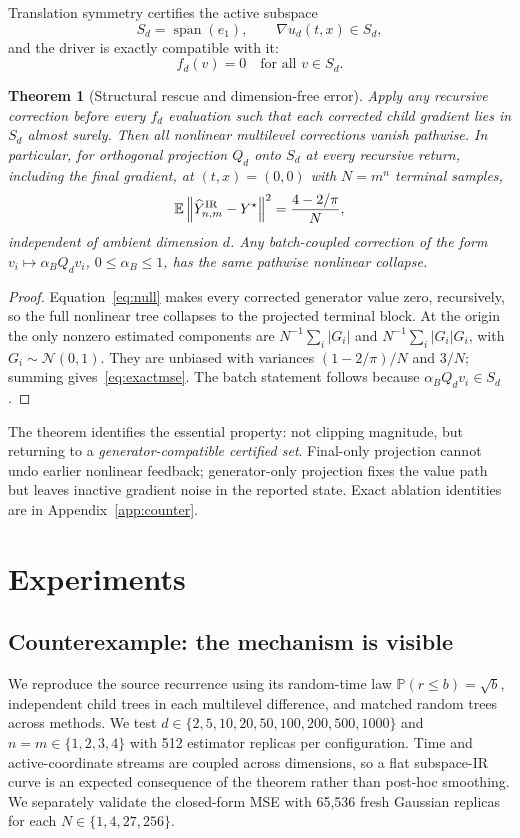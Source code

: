 \documentclass{article}
\newtheorem{theorem}{Theorem}
\newcommand{\E}{\mathbb E}
\newcommand{\norm}[1]{\left\lVert #1\right\rVert}
\begin{document}
Translation symmetry certifies the active subspace
\[
S_d=\operatorname{span}(e_1),\qquad \nabla u_d(t,x)\in S_d,
\]
and the driver is exactly compatible with it:
\begin{equation}
f_d(v)=0\quad\text{for all }v\in S_d.
\label{eq:null}
\end{equation}

\begin{theorem}[Structural rescue and dimension-free error]
\label{thm:rescue}
Apply any recursive correction before every $f_d$ evaluation such that each corrected child gradient lies in $S_d$ almost surely. Then all nonlinear multilevel corrections vanish pathwise. In particular, for orthogonal projection $Q_d$ onto $S_d$ at every recursive return, including the final gradient, at $(t,x)=(0,0)$ with $N=m^n$ terminal samples,
\begin{equation}
\E\norm{\widehat Y^{\rm IR}_{n,m}-Y^\star}^2
=\frac{4-2/\pi}{N},
\label{eq:exactmse}
\end{equation}
independent of ambient dimension $d$. Any batch-coupled correction of the form $v_i\mapsto\alpha_BQ_dv_i$, $0\le\alpha_B\le1$, has the same pathwise nonlinear collapse.
\end{theorem}
\begin{proof}
Equation~\eqref{eq:null} makes every corrected generator value zero, recursively, so the full nonlinear tree collapses to the projected terminal block. At the origin the only nonzero estimated components are
$N^{-1}\sum_i|G_i|$ and $N^{-1}\sum_i|G_i|G_i$, with $G_i\sim\mathcal N(0,1)$. They are unbiased with variances $(1-2/\pi)/N$ and $3/N$; summing gives~\eqref{eq:exactmse}. The batch statement follows because $\alpha_BQ_dv_i\in S_d$.
\end{proof}

The theorem identifies the essential property: not clipping magnitude, but returning to a \emph{generator-compatible certified set}. Final-only projection cannot undo earlier nonlinear feedback; generator-only projection fixes the value path but leaves inactive gradient noise in the reported state. Exact ablation identities are in Appendix~\ref{app:counter}.

\section{Experiments}
\subsection{Counterexample: the mechanism is visible}
We reproduce the source recurrence using its random-time law $\mathbb P(r\le b)=\sqrt b$, independent child trees in each multilevel difference, and matched random trees across methods. We test $d\in\{2,5,10,20,50,100,200,500,1000\}$ and $n=m\in\{1,2,3,4\}$ with 512 estimator replicas per configuration. Time and active-coordinate streams are coupled across dimensions, so a flat subspace-IR curve is an expected consequence of the theorem rather than post-hoc smoothing. We separately validate the closed-form MSE with 65,536 fresh Gaussian replicas for each $N\in\{1,4,27,256\}$.
\end{document}
